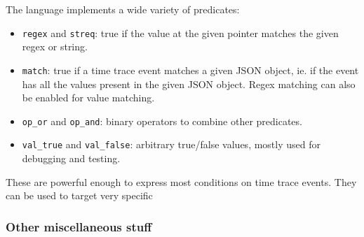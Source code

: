\documentclass[../main]{subfiles}
\begin{document}
The language implements a wide variety of predicates:

\begin{itemize}
\item \lstinline{regex} and \lstinline{streq}: true if the value at the given
      pointer matches the given regex or string.
\item \lstinline{match}: true if a time trace event matches a given JSON object,
      ie. if the event has all the values present in the given JSON object.
      Regex matching can also be enabled for value matching.
\item \lstinline{op_or} and \lstinline{op_and}: binary operators to combine
      other predicates.
\item \lstinline{val_true} and \lstinline{val_false}: arbitrary true/false
      values, mostly used for debugging and testing.
\end{itemize}

These are powerful enough to express most conditions on time trace events.
They can be used to target very specific

\subsubsection{Other miscellaneous stuff}

\end{document}

